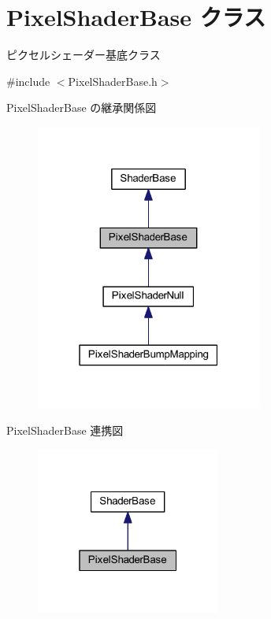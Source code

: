 \hypertarget{class_pixel_shader_base}{}\section{Pixel\+Shader\+Base クラス}
\label{class_pixel_shader_base}


ピクセルシェーダー基底クラス  




{\ttfamily \#include $<$Pixel\+Shader\+Base.\+h$>$}



Pixel\+Shader\+Base の継承関係図\nopagebreak
\begin{figure}[H]
\begin{center}
\leavevmode
\includegraphics[width=211pt]{class_pixel_shader_base__inherit__graph}
\end{center}
\end{figure}


Pixel\+Shader\+Base 連携図\nopagebreak
\begin{figure}[H]
\begin{center}
\leavevmode
\includegraphics[width=172pt]{class_pixel_shader_base__coll__graph}
\end{center}
\end{figure}
